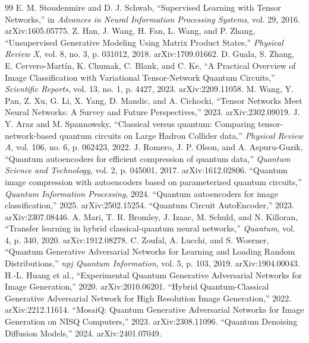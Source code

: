 \documentclass[11pt]{article}
\begin{document}
\begin{thebibliography}{99}
 E. M. Stoudenmire and D. J. Schwab, ``Supervised Learning with Tensor Networks,'' in \textit{Advances in Neural Information Processing Systems}, vol. 29, 2016. arXiv:1605.05775.
 Z. Han, J. Wang, H. Fan, L. Wang, and P. Zhang, ``Unsupervised Generative Modeling Using Matrix Product States,'' \textit{Physical Review X}, vol. 8, no. 3, p. 031012, 2018. arXiv:1709.01662.
 D. Guala, S. Zhang, E. Cervero-Mart\'in, K. Chumak, C. Blank, and C. Ke, ``A Practical Overview of Image Classification with Variational Tensor-Network Quantum Circuits,'' \textit{Scientific Reports}, vol. 13, no. 1, p. 4427, 2023. arXiv:2209.11058.
 M. Wang, Y. Pan, Z. Xu, G. Li, X. Yang, D. Mandic, and A. Cichocki, ``Tensor Networks Meet Neural Networks: A Survey and Future Perspectives,'' 2023. arXiv:2302.09019.
 J. Y. Araz and M. Spannowsky, ``Classical versus quantum: Comparing tensor-network-based quantum circuits on Large Hadron Collider data,'' \textit{Physical Review A}, vol. 106, no. 6, p. 062423, 2022.
 J. Romero, J. P. Olson, and A. Aspuru-Guzik, ``Quantum autoencoders for efficient compression of quantum data,'' \textit{Quantum Science and Technology}, vol. 2, p. 045001, 2017. arXiv:1612.02806.
 ``Quantum image compression with autoencoders based on parameterized quantum circuits,'' \textit{Quantum Information Processing}, 2024.
 ``Quantum autoencoders for image classification,'' 2025. arXiv:2502.15254.
 ``Quantum Circuit AutoEncoder,'' 2023. arXiv:2307.08446.
 A. Mari, T. R. Bromley, J. Izaac, M. Schuld, and N. Killoran, ``Transfer learning in hybrid classical-quantum neural networks,'' \textit{Quantum}, vol. 4, p. 340, 2020. arXiv:1912.08278.
 C. Zoufal, A. Lucchi, and S. Woerner, ``Quantum Generative Adversarial Networks for Learning and Loading Random Distributions,'' \textit{npj Quantum Information}, vol. 5, p. 103, 2019. arXiv:1904.00043.
 H.-L. Huang et al., ``Experimental Quantum Generative Adversarial Networks for Image Generation,'' 2020. arXiv:2010.06201.
 ``Hybrid Quantum-Classical Generative Adversarial Network for High Resolution Image Generation,'' 2022. arXiv:2212.11614.
 ``MosaiQ: Quantum Generative Adversarial Networks for Image Generation on NISQ Computers,'' 2023. arXiv:2308.11096.
 ``Quantum Denoising Diffusion Models,'' 2024. arXiv:2401.07049.

\end{thebibliography}
\end{document}
